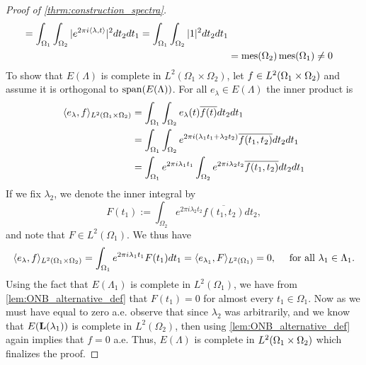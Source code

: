 \documentclass[../thesis.tex]{subfiles}
\begin{document}
\begin{proof}[Proof of  \cref{thrm:construction_spectra}]
\begin{align*}
        =\int_{\Omega_1} \int_{\Omega_2} |e^{2 \pi i \langle\lambda, t\rangle}|^2 dt_2 dt_1
        = \int_{\Omega_1} \int_{\Omega_2} |1|^2 dt_2 dt_1\\
        &= \operatorname{mes}(\Omega_2)\operatorname{mes}(\Omega_1) \neq 0
    \end{align*}
    To show that $E(\Lambda)$ is complete in $L^2(\Omega_1 \times \Omega_2)$, let $f\in L^2(\Omega_1 \times \Omega_2)$ and assume it is orthogonal to $\operatorname{span}(E(\Lambda))$. For all $e_\lambda \in E(\Lambda)$ the inner product is
    \begin{align*} %
        \braa{e_\lambda,f}_{L^2\brac{\Omega_1 \times \Omega_2}}
        &= \int_{\Omega_1} \int_{\Omega_2} e_\lambda(t) \overline{f(t)} dt_2dt_1 \\
        &= \int_{\Omega_1} \int_{\Omega_2} e^{2\pi i  (\lambda_1 t_1 + \lambda_2 t_2)} \overline{f(t_1,t_2)} dt_2 dt_1 \\
        &= \int_{\Omega_1} e^{2 \pi i \lambda_1 t_1} \int_{\Omega_2}e^{2 \pi i \lambda_2 t_2} \overline{f(t_1,t_2)} dt_2 dt_1
    \end{align*}
    If we fix $\lambda_2$, we denote the inner integral by 
    \begin{equation}\label{eq:inner_eq}
        F(t_1) := \int_{\Omega_2} e^{2 \pi i \lambda_2 t_2} \overline{f(t_1,t_2)} dt_2,
    \end{equation}
    and note that $F\in L^2(\Omega_1)$. We thus have %
    \begin{equation*}%
        \braa{e_{\lambda}, f}_{L^2(\Omega_1\times \Omega_2)} = \int_{\Omega_1} e^{2 \pi i \lambda_1 t_1} F(t_1) dt_1 = \braa{e_{\lambda_1}, F}_{L^2(\Omega_1)} = 0, \quad \text{ for all } \lambda_1 \in \Lambda_1 .
    \end{equation*}
    Using the fact that $E(\Lambda_1)$ is complete in $L^2(\Omega_1)$, we have from \cref{lem:ONB_alternative_def} that $F(t_1)=0$ for almost every $t_1 \in \Omega_1$. Now as we must have  equal to zero a.e. observe that since $\lambda_2$ was arbitrarily, and we know that $E(\mathbf{L}(\lambda_1))$ is complete in $L^2(\Omega_2)$, then using \cref{lem:ONB_alternative_def} again implies that $f=0$ a.e. Thus, $E(\Lambda)$ is complete in $L^2(\Omega_1 \times \Omega_2)$ which finalizes the proof.
\end{proof}
\end{document}
